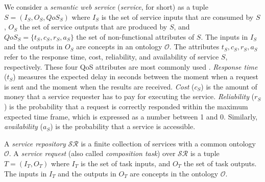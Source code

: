 \documentclass{llncs}
\begin{document}
We consider a \emph{semantic web service} (\emph{service}, for short) as a tuple $S = (I_{S}, O_{S}, QoS_S)$ where $I_{S}$ is the set of service inputs that are consumed by $S$, $O_{S}$ the set of service outputs that are produced by $S$, and $QoS_{S}=\{t_S, c_S, r_S, a_S\}$ the set of non-functional attributes of $S$. The inputs in $I_{S}$ and the outputs in $O_{S}$ are concepts in an ontology $\mathcal{O}$. The attributes $t_S, c_S, r_S, a_S$ refer to the response time, cost, reliability, and availability of service $S$, respectively. These four QoS attributes are most commonly used \cite{zeng2003quality}. \textit{Response time} ($t_S$) measures the expected delay in seconds between the moment when a request is sent and the moment when the results are received. \textit{Cost} ($c_S$) is the amount of money that a service requester has to pay for executing the service. \textit{Reliability} ($r_S$) is the probability that a request is correctly responded within the maximum expected time frame, which is expressed as a number between 1 and 0. Similarly, \textit{availability} ($a_S$) is the probability that a service is accessible. 

A \emph{service repository} $\mathcal{SR}$ is a finite collection of services with a common ontology $\mathcal{O}$. A \emph{service request} (also called \emph{composition task}) over $\mathcal{SR}$ is a tuple $T=(I_{T}, O_{T})$ where $I_{T}$ is the set of task inputs, and $O_{T}$ the set of task outputs. The inputs in $I_{T}$ and the outputs in $O_{T}$ are concepts in the ontology $\mathcal{O}$.
\end{document}
